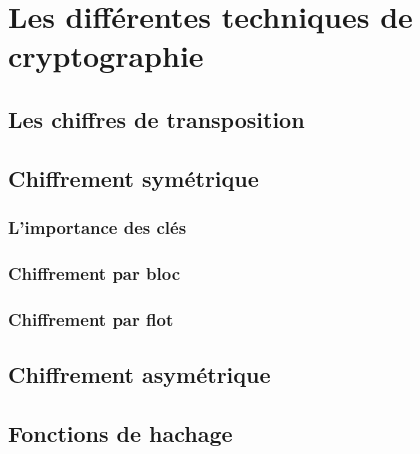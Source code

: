 \chapter{Les différentes techniques de cryptographie}



\section{Les chiffres de transposition}

\section{Chiffrement symétrique}
\subsection{L'importance des clés}
\subsection{Chiffrement par bloc}
\subsection{Chiffrement par flot}

\section{Chiffrement asymétrique}

\section{Fonctions de hachage}
